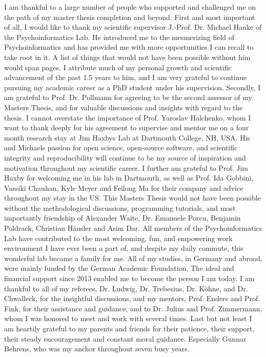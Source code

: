 \documentclass[a4paper, 11pt]{scrreprt}
\begin{document}
I am thankful to a large number of people who supported and challenged me on the path of my master thesis completion and beyond. First and most important of all, I would like to thank my scientific supervisor J.-Prof. Dr. Michael Hanke of the Psychoinformatics Lab. He introduced me to the mesmerizing field of Psychoinformatics and has provided me with more opportunities I can recall to take root in it. A list of things that would not have been possible without him would span pages. I attribute much of my personal growth and scientific advancement of the past 1.5 years to him, and I am very grateful to continue pursuing my academic career as a PhD student under his supervision. \newline
Secondly, I am grateful to Prof. Dr. Pollmann for agreeing to be the second assessor of my Masters Thesis, and for valuable discussions and insights with regard to the thesis.\newline
I cannot overstate the importance of Prof. Yaroslav Halchenko, whom I want to thank deeply for his agreement to supervise and mentor me on a four month research stay at Jim Haxbys Lab at Dartmouth College, NH, USA. His and Michaels passion for open science, open-source software, and scientific integrity and reproducibility will continue to be my source of inspiration and motivation throughout my scientific career.\newline
I further am grateful to Prof. Jim Haxby for welcoming me in his lab in Dartmouth, as well as Prof. Ida Gobbini, Vassiki Chauhan, Kyle Meyer and Feilong Ma for their company and advice throughout my stay in the US. \newline
This Masters Thesis would not have been possible without the methodological discussions, programming tutorials, and most importantly friendship of Alexander Waite, Dr. Emanuele Porcu, Benjamin Poldrack, Christian Häusler and Asim Dar. All members of the Psychoinformatics Lab have contributed to the most welcoming, fun, and empowering work environment I have ever been a part of, and despite my daily commute, this wonderful lab became a family for me. \newline
All of my studies, in Germany and abroad, were mainly funded by the German Academic Foundation. The ideal and financial support since 2013 enabled me to become the person I am today. I am thankful to all of my referees, Dr. Ludwig, Dr. Trebesius, Dr. Köhne, and Dr. Chwalleck, for the insightful discussions, and my mentors, Prof. Enders and Prof. Fink, for their assistance and guidance, and to Dr. Julius and Prof. Zimmermann, whom I was honored to meet and work with several times. \newline
Last but not least I am heartily grateful to my parents and friends for their patience, their support, their steady encouragement and constant moral guidance. Especially Gunnar Behrens, who was my anchor throughout seven busy years.
\end{document}
